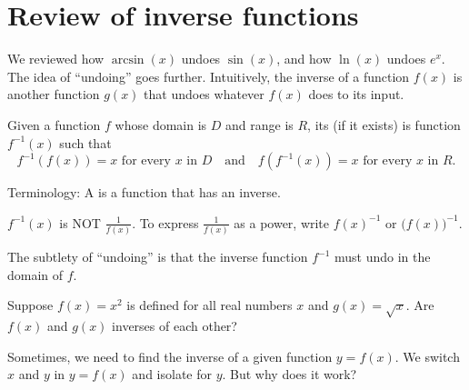 \documentclass[../main.tex]{subfiles}
\begin{document}
 \section{Review of inverse functions}

We reviewed how \(\arcsin(x)\) undoes \(\sin(x)\), and how \(\ln(x)\) undoes \(e^{x}\). The idea of \enquote{undoing} goes further. Intuitively, the inverse of a function \(f(x)\) is another function \(g(x)\) that undoes whatever \(f(x)\) does to its input.

\begin{definition}[inverse] \label{def:inverse}
  Given a function \(f\) whose domain is \(D\) and range is \(R\), its  (if it exists) is  function \(f^{-1}(x)\) such that
  \[
    f^{-1}(f(x)) = x \text{ for every \(x\) in \(D\)} \quad\text{and}\quad f(f^{-1}(x)) = x \text{ for every \(x\) in \(R\)}.
  \]

  Terminology: A  is a function that has an inverse.

  {\footnotesize \faExclamationTriangle{} \(f^{-1}(x)\) is NOT \(\tfrac{1}{f(x)}\). To express \(\tfrac{1}{f(x)}\) as a power, write \(f(x)^{-1}\) or \(\big( f(x) \big)^{-1}\).}

\end{definition}

The subtlety of \enquote{undoing} is that the inverse function \(f^{-1}\) must undo  in the domain of \(f\).

%

\begin{example} \label{eg:inverse-square}
  Suppose \(f(x) = x^{2}\) is defined for all real numbers \(x\) and \(g(x) = \sqrt{x}\). Are \(f(x)\) and \(g(x)\) inverses of each other?

  \blanks*
\end{example}
\clearpage

Sometimes, we need to find the inverse of a given function \(y = f(x)\). We switch \(x\) and \(y\) in \(y = f(x)\) and isolate for \(y\). But why does it work?
\end{document}
